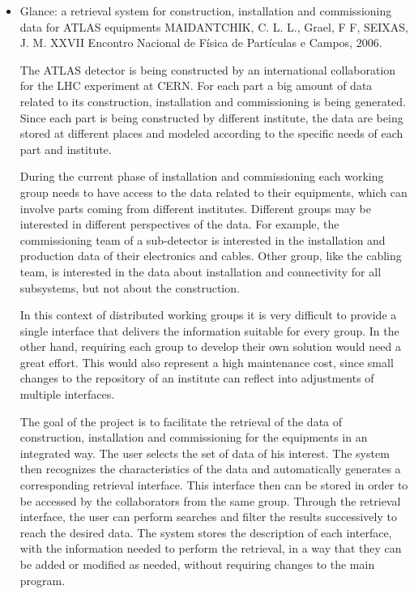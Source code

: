 \begin{itemize}
\item Glance: a retrieval system for construction, installation and
commissioning data for ATLAS equipments
MAIDANTCHIK, C. L. L., Grael, F F, SEIXAS, J. M.
XXVII Encontro Nacional de Física de Partículas e Campos, 2006.

The ATLAS detector is being constructed by an international collaboration for
the LHC experiment at CERN.  For each part a big amount of data related to its
construction, installation and commissioning is being generated.  Since each
part is being constructed by different institute, the data are being stored at
different places and modeled according to the specific needs of each part and
institute.

During the current phase of installation and commissioning each working group
needs to have access to the data related to their equipments, which can involve
parts coming from different institutes. Different groups may be interested in
different perspectives of the data. For example, the commissioning team of a
sub-detector is interested in the installation and production data of their
electronics and cables. Other group, like the cabling team, is interested in
the data about installation and connectivity for all subsystems, but not about
the construction.

In this context of distributed working groups it is very difficult to provide a
single interface that delivers the information suitable for every group. In the
other hand, requiring each group to develop their own solution would need a
great effort. This would also represent a high maintenance cost, since small
changes to the repository of an institute can reflect into adjustments of
multiple interfaces.

The goal of the project is to facilitate the retrieval of the data of
construction, installation and commissioning for the equipments in an
integrated way. The user selects the set of data of his interest. The system
then recognizes the characteristics of the data and automatically generates a
corresponding retrieval interface. This interface then can be stored in order
to be accessed by the collaborators from the same group. Through the retrieval
interface, the user can perform searches and filter the results successively to
reach the desired data.  The system stores the description of each interface,
with the information needed to perform the retrieval, in a way that they can be
added or modified as needed, without requiring changes to the main program.


\end{itemize}
